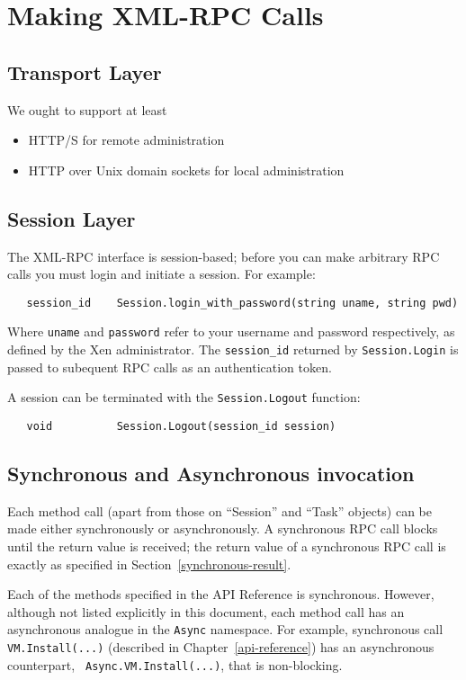 \section{Making XML-RPC Calls}

\subsection{Transport Layer}

We ought to support at least
\begin{itemize}
\item HTTP/S for remote administration
\item HTTP over Unix domain sockets for local administration
\end{itemize}

\subsection{Session Layer}

The XML-RPC interface is session-based; before you can make arbitrary RPC calls
you must login and initiate a session. For example:
\begin{verbatim}
   session_id    Session.login_with_password(string uname, string pwd)
\end{verbatim}
Where {\tt uname} and {\tt password} refer to your username and password
respectively, as defined by the Xen administrator.
The {\tt session\_id} returned by {\tt Session.Login} is passed to subequent
RPC calls as an authentication token.

A session can be terminated with the {\tt Session.Logout} function:
\begin{verbatim}
   void          Session.Logout(session_id session)
\end{verbatim}

\subsection{Synchronous and Asynchronous invocation}

Each method call (apart from those on ``Session'' and ``Task'' objects)
can be made either synchronously or asynchronously.
A synchronous RPC call blocks until the
return value is received; the return value of a synchronous RPC call is
exactly as specified in Section~\ref{synchronous-result}.

Each of the methods specified in the API Reference is synchronous.
However, although not listed explicitly in this document, each
method call has an asynchronous analogue in the {\tt Async}
namespace. For example, synchronous call {\tt VM.Install(...)}
(described in Chapter~\ref{api-reference})
has an asynchronous counterpart, {\tt
Async.VM.Install(...)}, that is non-blocking.

